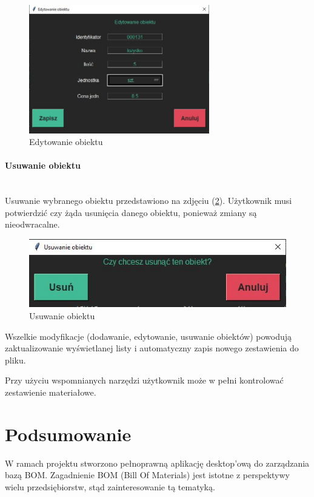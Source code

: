 \documentclass[12pt,twoside]{article}
\begin{document}
\begin{figure}[H]
	\centering
	\includegraphics[width=0.7\textwidth]{figures/app/bom_edit_item.jpg}
	\caption{Edytowanie obiektu}
\label{fig:app:bom_edit_item}
\end{figure}

\paragraph*{Usuwanie obiektu}\mbox{}\\
Usuwanie wybranego obiektu przedstawiono na zdjęciu (\ref{fig:app:bom_remove_item}). Użytkownik musi potwierdzić czy żąda usunięcia danego obiektu, ponieważ zmiany są nieodwracalne.

\begin{figure}[H]
	\centering
	\includegraphics[width=\textwidth]{figures/app/bom_remove_item.jpg}
	\caption{Usuwanie obiektu}
\label{fig:app:bom_remove_item}
\end{figure}

Wszelkie modyfikacje (dodawanie, edytowanie, usuwanie obiektów) powodują zaktualizowanie wyświetlanej listy i automatyczny zapis nowego zestawienia do pliku.

Przy użyciu wspomnianych narzędzi użytkownik może w pełni kontrolować zestawienie materiałowe.

\clearpage
\section{Podsumowanie}
W ramach projektu stworzono pełnoprawną aplikację desktop'ową do zarządzania bazą BOM. Zagadnienie BOM (Bill Of Materials) jest istotne z perspektywy wielu przedsiębiorstw, stąd zainteresowanie tą tematyką.
\end{document}
